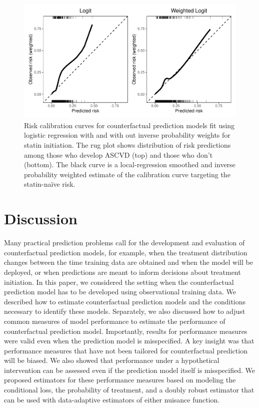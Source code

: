 \begin{figure}[p]
    \centering
    \includegraphics{../3_figures/calib.pdf}
    \caption{Risk calibration curves for counterfactual prediction models fit using logistic regression with and with out inverse probability weights for statin initiation. The rug plot shows distribution of risk predictions among those who develop ASCVD (top) and those who don't (bottom). The black curve is a local-regression smoothed and inverse probability weighted estimate of the calibration curve targeting the statin-na\"{i}ve risk.\label{fig:calib}}
\end{figure}




\section{Discussion} \label{sec:discussion}

Many practical prediction problems call for the development and evaluation of counterfactual prediction models, for example, when the treatment distribution changes between the time training data are obtained and when the model will be deployed, or when predictions are meant to inform decisions about treatment initiation. In this paper, we considered the setting when the counterfactual prediction model has to be developed using observational training data. We described how to estimate counterfactual prediction models and the conditions necessary to identify these models. Separately, we also discussed how to adjust common measures of model performance to estimate the performance of counterfactual prediction model. Importantly, results for performance measures were valid even when the prediction model is misspecified. A key insight was that performance measures that have not been tailored for counterfactual prediction will be biased. We also showed that performance under a hypothetical intervention can be assessed even if the prediction model itself is misspecified. We proposed estimators for these performance measures based on modeling the conditional loss, the probability of treatment, and a doubly robust estimator that can be used with data-adaptive estimators of either nuisance function. 

